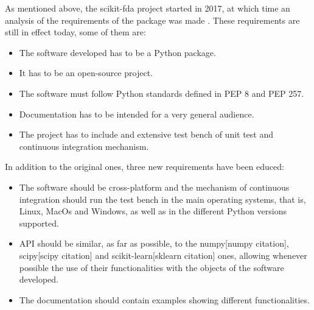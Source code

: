 
As mentioned above, the scikit-fda project started in 2017, at which time an
analysis of the requirements of the package was made \cite{FDA2018}. These
requirements are still in effect today, some of them are:

\begin{itemize}
\item The software developed has to be a Python package.
\item It has to be an open-source project.
\item The software must follow Python standards defined in PEP 8 and PEP 257.
\item Documentation has to be intended for a very general audience.
\item The project has to include and extensive test bench of unit test and continuous integration mechanism.
\end{itemize}
In addition to the original ones, three new requirements have been educed:

\begin{itemize}
\item The software should be cross-platform and the mechanism of
 continuous integration should run the test bench in the main operating systems, that is, 
 Linux, MacOs and Windows, as well as in the different Python versions supported.
 
\item  API should be similar, as far as possible, to the numpy[numpy citation], scipy[scipy citation] and
 scikit-learn[sklearn citation] ones, allowing whenever possible the use of their functionalities with the
  objects of the software developed.
\item The documentation should contain examples showing different functionalities.
\end{itemize}
